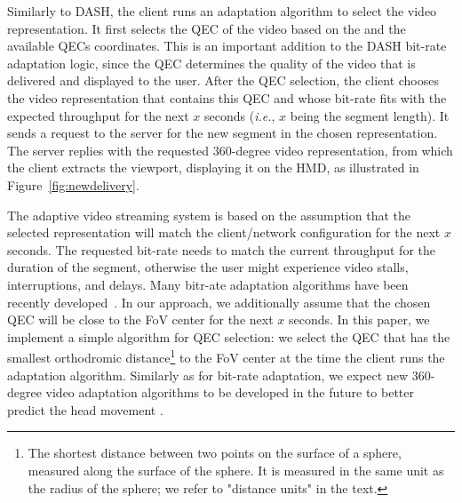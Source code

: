  Similarly to DASH, the client runs an
adaptation algorithm to select the video representation. It first
selects the QEC of the video based on the 
and
the available QECs coordinates. This is an important addition to the
DASH bit-rate adaptation logic, since the QEC determines the quality of
the video that is delivered and displayed to the user. After
the QEC selection, the client chooses the video representation that
contains this QEC and whose bit-rate fits with the expected throughput for
the next $x$ seconds (\textit{i.e.}, $x$ being the segment length). It
sends a request to the server for the new segment in the chosen
representation. The server replies with the requested 360-degree video
representation, from which the client extracts the viewport,
displaying it on the HMD, as illustrated in Figure~\ref{fig:newdelivery}. 

The adaptive video streaming system is based on the assumption that
the selected representation will match the client/network
configuration for the next $x$ seconds. The requested bit-rate needs to
match the current throughput for the duration of the segment,
otherwise the user might experience video stalls, interruptions, and
delays. Many bitr-ate adaptation algorithms have been recently
developed~\cite{tian,probe_li_2014,miller,zou,liu}. In our approach,
we additionally assume that the chosen \ac{QEC} will be close to the \ac{FoV}
center for the next $x$ seconds. In this paper, we implement a simple
algorithm for \ac{QEC} selection: we select the \ac{QEC} that has the smallest
orthodromic distance\footnote{The shortest distance between two points
on the surface of a sphere, measured along the surface of the sphere. It is 
measured in the same unit as the radius of the sphere; we refer to "distance units" in the text.}
to the FoV center at the time the client runs the adaptation
algorithm.
Similarly as for bit-rate adaptation, we expect new 360-degree video
adaptation algorithms to be developed in the future to better predict
the head movement .
 


